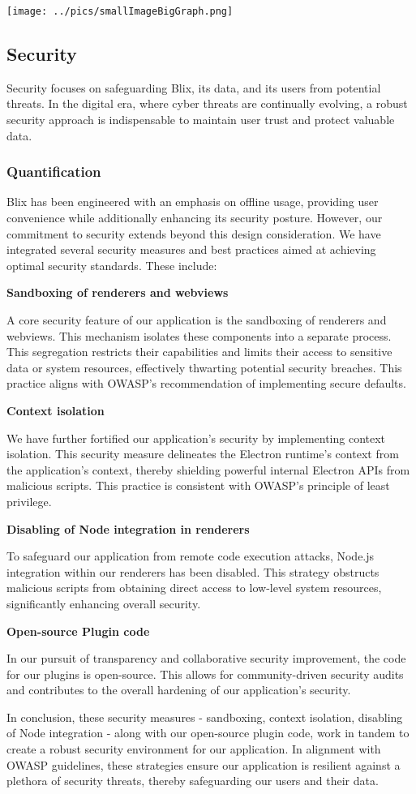 \documentclass[11pt,a4paper]{article}
\begin{document}
\texttt{[image: ../pics/smallImageBigGraph.png]}


\subsection*{Security}

Security focuses on safeguarding Blix, its data, and its users from potential
threats. In the digital era, where cyber threats are continually evolving, a
robust security approach is indispensable to maintain user trust and protect
valuable data.

\subsubsection*{Quantification}

Blix has been engineered with an emphasis on offline usage, providing user
convenience while additionally enhancing its security posture. However, our
commitment to security extends beyond this design consideration. We have
integrated several security measures and best practices aimed at achieving
optimal security standards. These include:

\textbf{Sandboxing of renderers and webviews}

A core security feature of our application is the sandboxing of renderers and
webviews. This mechanism isolates these components into a separate process. This
segregation restricts their capabilities and limits their access to sensitive
data or system resources, effectively thwarting potential security breaches.
This practice aligns with OWASP's recommendation of implementing secure
defaults.

\textbf{Context isolation}

We have further fortified our application's security by implementing context
isolation. This security measure delineates the Electron runtime's context from
the application's context, thereby shielding powerful internal Electron APIs
from malicious scripts. This practice is consistent with OWASP's principle of
least privilege.

\textbf{Disabling of Node integration in renderers}

To safeguard our application from remote code execution attacks, Node.js
integration within our renderers has been disabled. This strategy obstructs
malicious scripts from obtaining direct access to low-level system resources,
significantly enhancing overall security.

\textbf{Open-source Plugin code}

In our pursuit of transparency and collaborative security improvement, the code
for our plugins is open-source. This allows for community-driven security audits
and contributes to the overall hardening of our application's security.

In conclusion, these security measures - sandboxing, context isolation,
disabling of Node integration - along with our open-source plugin code, work in
tandem to create a robust security environment for our application. In alignment
with OWASP guidelines, these strategies ensure our application is resilient
against a plethora of security threats, thereby safeguarding our users and their
data.
\end{document}
